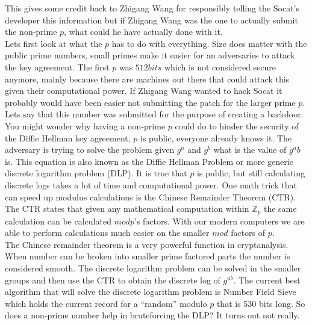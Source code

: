\documentclass[letterpaper,11pt,notitlepage,fleqn]{article}
\begin{document}
This gives some credit back to Zhigang Wang for responsibly telling the Socat's developer this information but if Zhigang Wang was the one to actually submit the non-prime $p$, what could he have actually done with it.
\\
\indent Lets first look at what the $p$ has to do with everything. Size does matter with the public prime numbers, small primes make it easier for an adversaries to attack the key agreement. The first $p$ was $512 bits$ which is not considered secure anymore, mainly because there are machines out there that could attack this given their computational power. If Zhigang Wang wanted to hack Socat it probably would have been easier not submitting the patch for the larger prime $p$. Lets say that this number was submitted for the purpose of creating a backdoor.
\\
\indent You might wonder why having a non-prime $p$ could do to hinder the security of the Diffie Hellman key agreement, $p$ is public, everyone already knows it. The adversary is trying to solve the problem given $g^a$ and $g^b$ what is the value of $g^ab$ is. This equation is also known as the Diffie Hellman Problem or more generic discrete logarithm problem (DLP). It is true that $p$ is public, but still calculating discrete logs takes a lot of time and computational power.  One math trick that can speed
up modulus calculations is the Chinese Remainder Theorem (CTR). The CTR states that given any mathematical computation within $\mathbb{Z}_{p}$ the same calculation can be calculated $mod p$'s factors. With our modern computers we are able to perform calculations much easier on the smaller $mod$ factors of $p$.
\\
\indent The Chinese remainder theorem is a very powerful function in cryptanalysis. When number can be broken into smaller prime factored parts the number is considered smooth. The discrete logarithm problem can be solved in the smaller groups and then use the CTR to obtain the discrete log of $g^{ab}$. The current best algorithm that will solve the discrete logarithm problem is Number Field Sieve which holds the current record for a “random” modulo $p$ that is 530 bits long. So does a non-prime number help in bruteforcing the DLP? It turns out not really.
\end{document}
